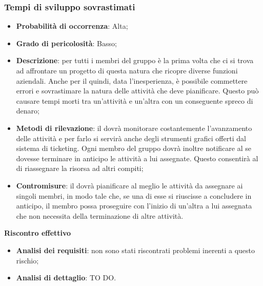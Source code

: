 		\subsubsection{Tempi di sviluppo sovrastimati} %
		\label{ssub:tempi_di_sviluppo_sovrastimati}
			\begin{itemize}
				\item \textbf{Probabilità di occorrenza}: Alta;
				\item \textbf{Grado di pericolosità}: Basso;
				\item \textbf{Descrizione}: per tutti i membri del gruppo è la prima volta che ci si trova ad affrontare un progetto di questa natura che ricopre diverse funzioni aziendali. Anche per il \roleProjectManager{} quindi, data l'inesperienza, è possibile commettere errori e sovrastimare la natura delle attività che deve pianificare. Questo può causare tempi morti tra un'attività e un'altra con un conseguente spreco di denaro;
				\item \textbf{Metodi di rilevazione}: il \roleProjectManager{} dovrà monitorare costantemente l'avanzamento delle attività e per farlo si servirà anche degli strumenti grafici offerti dal sistema di ticketing. Ogni membro del gruppo dovrà inoltre notificare al \roleProjectManager{} se dovesse terminare in anticipo le attività a lui assegnate. Questo consentirà al \roleProjectManager{} di riassegnare la risorsa ad altri compiti;
				\item \textbf{Contromisure}: il \roleProjectManager{} dovrà pianificare al meglio le attività da assegnare ai singoli membri, in modo tale che, se una di esse si riuscisse a concludere in anticipo, il membro possa proseguire con l'inizio di un'altra a lui assegnata che non necessita della terminazione di altre attività.
			\end{itemize}
		\noindent
		\textbf{Riscontro effettivo}
			\begin{itemize}
				\item \textbf{Analisi dei requisiti}: non sono stati riscontrati problemi inerenti a questo rischio;
				\item \textbf{Analisi di dettaglio}: TO DO.
			\end{itemize}



	\newpage
